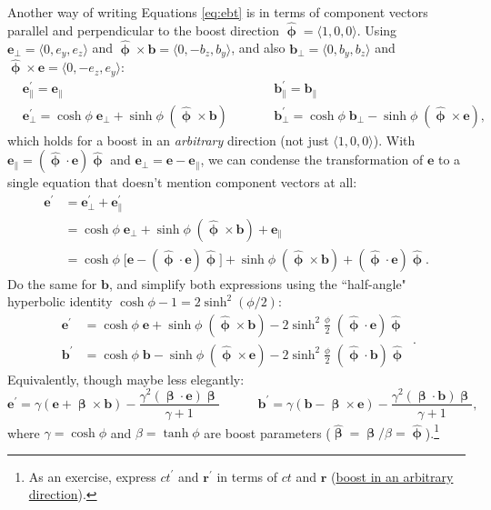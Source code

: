 \documentclass[12pt]{article}
\renewcommand{\vv}[1]{\mathbf{#1}}
\newcommand{\vvbeta}{\bm{\upbeta}}
\newcommand{\hatbeta}{\bm{\hat{\upbeta}}}
\newcommand{\hatphi}{\bm{\hat{\upphi}}}
\begin{document}
Another way of writing Equations \ref{eq:ebt} is in terms of component vectors parallel and perpendicular to the boost direction $\hatphi = \langle 1, 0, 0 \rangle$. Using ${\vv e_\perp = \langle 0, e_y, e_z \rangle}$ and $\hatphi \times \vv b = \langle 0, -b_z, b_y \rangle$, and also $\vv b_\perp = \langle 0, b_y, b_z \rangle$ and $\hatphi \times \vv e = \langle 0, -e_z, e_y \rangle$:
\begin{equation*}
\begin{aligned}
& \vv e^\prime_\parallel = \vv e_\parallel  \qquad \qquad& & \vv b^\prime_\parallel = \vv b_\parallel  \\
& \vv e^\prime_\perp =  \cosh{\phi} \; \vv e_\perp  +  \sinh{\phi} \; ( \hatphi \times \vv b )   \qquad& & \vv b^\prime_\perp = \cosh{\phi} \; \vv b_\perp  - \sinh{\phi} \; ( \hatphi \times \vv e ) ,
\end{aligned}
\end{equation*}
which holds for a boost in an \emph{arbitrary} direction (not just $\langle 1, 0, 0 \rangle$). With $\vv e_\parallel = (\hatphi \cdot \vv e) \hatphi$ and $\vv e_\perp = \vv e - \vv e_\parallel$, we can condense the transformation of $\vv e$ to a single equation that doesn't mention component vectors at all:
\begin{equation*}
\begin{split}
\vv e^\prime &= \vv e^\prime_\perp  + \vv e^\prime_\parallel \\
&= \cosh{\phi} \; \vv e_\perp  +  \sinh{\phi} \; ( \hatphi \times \vv b ) + \vv e_\parallel \\
&= \cosh{\phi} \; \big[ \vv e - (\hatphi \cdot \vv e) \hatphi \big] + \sinh{\phi} \; (\hatphi \times \vv b) + (\hatphi \cdot \vv e) \hatphi .
\end{split}
\end{equation*}
Do the same for $\vv b$, and simplify both expressions using the ``half-angle" hyperbolic identity $\cosh{\phi} - 1 = 2 \sinh^2{(\phi/2)}$:
\begin{equation}\label{eq:ebr}
\boxed{
\begin{aligned}
\vv e^\prime &= \cosh{\phi} \; \vv e + \sinh{\phi} \; (\hatphi \times \vv b) - 2 \sinh^2 \frac{\phi}{2} \; (\hatphi \cdot \vv e) \hatphi \\[4pt]
\vv b^\prime &= \cosh{\phi} \; \vv b - \sinh{\phi} \; (\hatphi \times \vv e) - 2 \sinh^2 \frac{\phi}{2} \; (\hatphi \cdot \vv b) \hatphi 
\end{aligned}
} \, .
\end{equation}
Equivalently, though maybe less elegantly:
\begin{equation*}
\vv e^\prime = \gamma \left( \vv e + \vvbeta \times \vv b \right) - \dfrac{\gamma^2 (\vvbeta \cdot \vv e) \vvbeta}{\gamma + 1} \qquad \quad \vv b^\prime = \gamma \left( \vv b - \vvbeta \times \vv e \right) - \dfrac{\gamma^2 (\vvbeta \cdot \vv b) \vvbeta}{\gamma + 1},
\end{equation*}
where $\gamma = \cosh{\phi}$ and $\beta = \tanh{\phi}$ are boost parameters ($\hatbeta = \vvbeta / \beta = \hatphi$).\footnote{As an exercise, express $ct^\prime$ and $\vv r^\prime$ in terms of $ct$ and $\vv r$ (\href{https://en.wikipedia.org/wiki/Lorentz_transformation\#Vector_transformations}{boost in an arbitrary direction}).}
\end{document}
